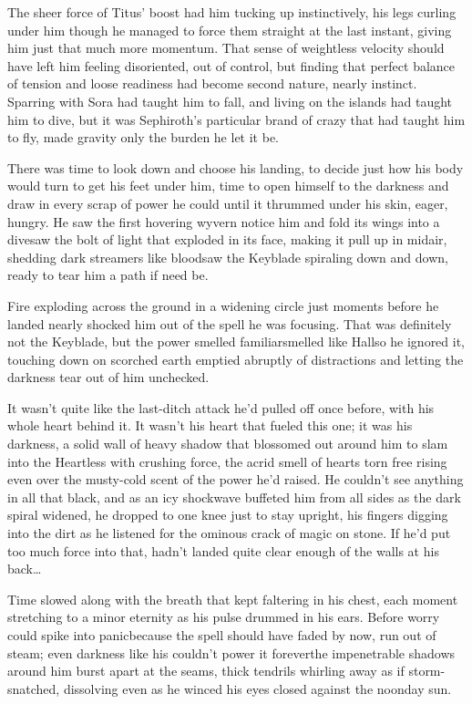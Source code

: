 The sheer force of Titus' boost had him tucking up instinctively, his legs curling under him though he managed to force them straight at the last instant, giving him just that much more momentum. That sense of weightless velocity should have left him feeling disoriented, out of control, but finding that perfect balance of tension and loose readiness had become second nature, nearly instinct. Sparring with Sora had taught him to fall, and living on the islands had taught him to dive, but it was Sephiroth's particular brand of crazy that had taught him to fly, made gravity only the burden he let it be.

There was time to look down and choose his landing, to decide just how his body would turn to get his feet under him, time to open himself to the darkness and draw in every scrap of power he could until it thrummed under his skin, eager, hungry. He saw the first hovering wyvern notice him and fold its wings into a dive\textemdash saw the bolt of light that exploded in its face, making it pull up in midair, shedding dark streamers like blood\textemdash saw the Keyblade spiraling down and down, ready to tear him a path if need be.

Fire exploding across the ground in a widening circle just moments before he landed nearly shocked him out of the spell he was focusing. That was definitely not the Keyblade, but the power smelled familiar\textemdash smelled like Hall\textemdash so he ignored it, touching down on scorched earth emptied abruptly of distractions and letting the darkness tear out of him unchecked.

It wasn't quite like the last-ditch attack he'd pulled off once before, with his whole heart behind it. It wasn't his heart that fueled this one; it was his darkness, a solid wall of heavy shadow that blossomed out around him to slam into the Heartless with crushing force, the acrid smell of hearts torn free rising even over the musty-cold scent of the power he'd raised. He couldn't see anything in all that black, and as an icy shockwave buffeted him from all sides as the dark spiral widened, he dropped to one knee just to stay upright, his fingers digging into the dirt as he listened for the ominous crack of magic on stone. If he'd put too much force into that, hadn't landed quite clear enough of the walls at his back\ldots 

Time slowed along with the breath that kept faltering in his chest, each moment stretching to a minor eternity as his pulse drummed in his ears. Before worry could spike into panic\textemdash because the spell should have faded by now, run out of steam; even darkness like his couldn't power it forever\textemdash the impenetrable shadows around him burst apart at the seams, thick tendrils whirling away as if storm-snatched, dissolving even as he winced his eyes closed against the noonday sun.

